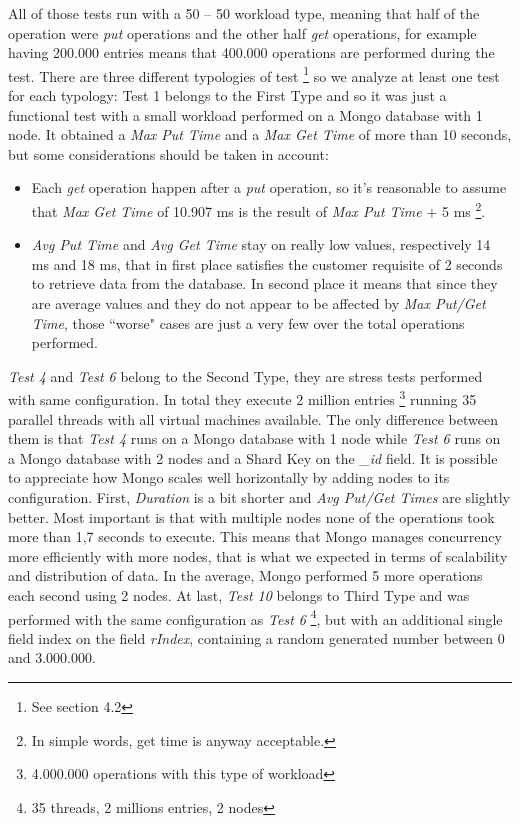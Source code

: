 All of those tests run with a 50 – 50 workload type, meaning that half of the operation were \textit{put} operations and the other half \textit{get} operations, for example having 200.000 entries means that 400.000 operations are performed during the test.
There are three different typologies of test \footnote{See section 4.2} so we analyze at least one test for each typology: Test 1 belongs to the First Type and so it was just a functional test with a small workload performed on a Mongo database with 1 node. It obtained a \textit{Max Put Time} and a \textit{Max Get Time} of more than 10 seconds, but some considerations should be taken in account:
\begin{itemize}
	\item Each \textit{get} operation happen after a \textit{put} operation, so it’s reasonable to assume that \textit{Max Get Time} of 10.907 ms is  the result of \textit{Max Put Time} + 5 ms \footnote{In simple words, get time is anyway acceptable.}.
	\item \textit{Avg Put Time} and \textit{Avg Get Time} stay on really low values, respectively 14 ms and 18 ms, that in first place satisfies the customer requisite of 2 seconds to retrieve data from the database. In second place it means that since they are average values and they do not appear to be affected by \textit{Max Put/Get Time},  those “worse" cases are just a very few over the total operations performed.
\end{itemize}
\textit{Test 4} and \textit{Test 6} belong to the Second Type, they are stress tests performed with same configuration. In total they execute 2 million entries \footnote {4.000.000 operations with this type of workload} running 35 parallel threads with all virtual machines available. The only difference between them is that \textit{Test 4} runs on a Mongo database with 1 node while \textit{Test 6} runs on a Mongo database with 2 nodes and a Shard Key on the \textit{\_id} field.
It is possible to appreciate how Mongo scales well horizontally by adding nodes to its configuration. First, \textit{Duration} is a bit shorter and \textit{Avg Put/Get Times} are slightly better. Most important is that with multiple nodes none of the operations took more than 1,7 seconds to execute. This means that Mongo manages concurrency more efficiently with more nodes, that is what we expected in terms of scalability and distribution of data. In the average, Mongo performed 5 more operations each second using 2 nodes.
At last, \textit{Test 10} belongs to Third Type and was performed with the same configuration as \textit{Test 6} \footnote{35 threads, 2 millions entries, 2 nodes}, but with an additional single field index on the field \textit{rIndex}, containing a random generated number between 0 and 3.000.000.
